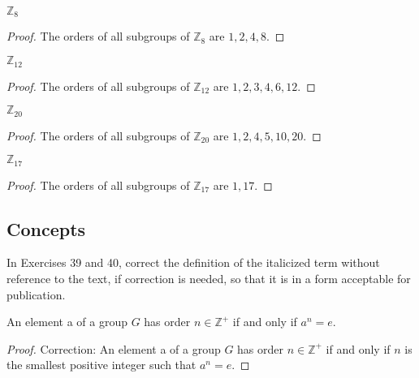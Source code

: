 \begin{exercise}
    $\mathbb{Z}_{8}$
\end{exercise}

\begin{proof}
    The orders of all subgroups of $\mathbb{Z}_{8}$ are $1, 2, 4, 8$.
\end{proof}

\begin{exercise}
    $\mathbb{Z}_{12}$
\end{exercise}

\begin{proof}
    The orders of all subgroups of $\mathbb{Z}_{12}$ are $1, 2, 3, 4, 6, 12$.
\end{proof}

\begin{exercise}
    $\mathbb{Z}_{20}$
\end{exercise}

\begin{proof}
    The orders of all subgroups of $\mathbb{Z}_{20}$ are $1, 2, 4, 5, 10, 20$.
\end{proof}

\begin{exercise}
    $\mathbb{Z}_{17}$
\end{exercise}

\begin{proof}
    The orders of all subgroups of $\mathbb{Z}_{17}$ are $1, 17$.
\end{proof}

\subsection*{Concepts}

In Exercises 39 and 40, correct the definition of the italicized term without reference to the text, if correction is needed, so that it is in a form acceptable for publication.

\begin{exercise}
    An element a of a group $G$ has order $n\in\mathbb{Z}^{+}$ if and only if $a^{n} = e$.
\end{exercise}

\begin{proof}
    Correction:  An element a of a group $G$ has order $n\in\mathbb{Z}^{+}$ if and only if $n$ is the smallest positive integer such that $a^{n} = e$.
\end{proof}

